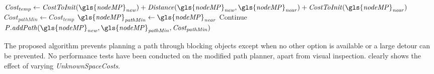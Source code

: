 \begin{algorithm}[H]
\begin{algorithmic}[1]
      \State $\mathit{Cost_{temp} \leftarrow CostToInit(\gls{nodeMP}_{new}) + Distance(\gls{nodeMP}_{new}, \gls{nodeMP}_{near})} + \mathit{CostToInit(\gls{nodeMP}_{near})}$
      \State $\mathit{Cost_{pathMin}} \leftarrow \mathit{Cost_{temp}}$
      \State $\mathit{\gls{nodeMP}_{pathMin} \leftarrow \gls{nodeMP}_{near}}$
      \EndIf
      \EndIf
      \State Continue
      \Else
      \State $\mathit{P.addPath(\gls{nodeMP}_{new}, \gls{nodeMP}_{pathMin}, Cost_{pathMin})}$
      \EndIf
      \EndFor
    \EndWhile
  \end{algorithmic}
\end{algorithm}

The proposed algorithm prevents planning a path through blocking objects except when no other option is available or a large detour can be prevented. No performance tests have been conducted on the modified path planner, apart from visual inspection.  clearly shows the effect of varying \textit{UnknownSpaceCosts}.

